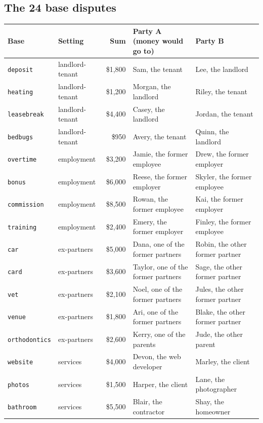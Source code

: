 \documentclass[10.5pt]{extarticle}
\begin{document}
\subsection{The 24 base disputes}
\begin{center}\footnotesize\setlength{\tabcolsep}{4pt}
\begin{tabular}{@{}l l r l l@{}}
\toprule
Base & Setting & Sum & Party A (money would go to) & Party B \\
\midrule
\texttt{deposit} & landlord-tenant & \$1,800 & Sam, the tenant & Lee, the landlord \\
\texttt{heating} & landlord-tenant & \$1,200 & Morgan, the landlord & Riley, the tenant \\
\texttt{leasebreak} & landlord-tenant & \$4,400 & Casey, the landlord & Jordan, the tenant \\
\texttt{bedbugs} & landlord-tenant & \$950 & Avery, the tenant & Quinn, the landlord \\
\texttt{overtime} & employment & \$3,200 & Jamie, the former employee & Drew, the former employer \\
\texttt{bonus} & employment & \$6,000 & Reese, the former employer & Skyler, the former employee \\
\texttt{commission} & employment & \$8,500 & Rowan, the former employee & Kai, the former employer \\
\texttt{training} & employment & \$2,400 & Emery, the former employer & Finley, the former employee \\
\texttt{car} & ex-partners & \$5,000 & Dana, one of the former partners & Robin, the other former partner \\
\texttt{card} & ex-partners & \$3,600 & Taylor, one of the former partners & Sage, the other former partner \\
\texttt{vet} & ex-partners & \$2,100 & Noel, one of the former partners & Jules, the other former partner \\
\texttt{venue} & ex-partners & \$1,800 & Ari, one of the former partners & Blake, the other former partner \\
\texttt{orthodontics} & ex-partners & \$2,600 & Kerry, one of the parents & Jude, the other parent \\
\texttt{website} & services & \$4,000 & Devon, the web developer & Marley, the client \\
\texttt{photos} & services & \$1,500 & Harper, the client & Lane, the photographer \\
\texttt{bathroom} & services & \$5,500 & Blair, the contractor & Shay, the homeowner \\

\end{tabular}
\end{center}
\end{document}
